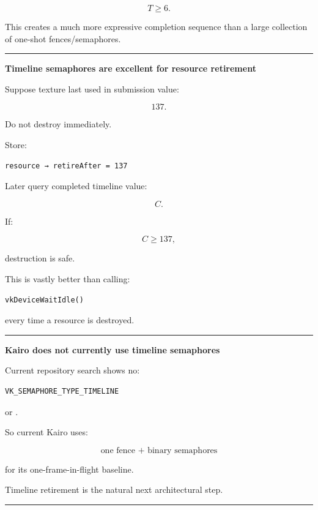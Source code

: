 \[
T\ge6.
\]

This creates a much more expressive completion sequence than a large collection of one-shot fences/semaphores.

\begin{center}\rule{0.5\linewidth}{0.5pt}\end{center}

\textbf{Timeline semaphores are excellent for resource retirement}

Suppose texture last used in submission value:

\[
137.
\]

Do not destroy immediately.

Store:

\begin{verbatim}
resource → retireAfter = 137
\end{verbatim}

Later query completed timeline value:

\[
C.
\]

If:

\[
C\ge137,
\]

destruction is safe.

This is vastly better than calling:

\begin{verbatim}
vkDeviceWaitIdle()
\end{verbatim}

every time a resource is destroyed.

\begin{center}\rule{0.5\linewidth}{0.5pt}\end{center}

\textbf{Kairo does not currently use timeline semaphores}

Current repository search shows no:

\begin{verbatim}
VK_SEMAPHORE_TYPE_TIMELINE
\end{verbatim}

or .

So current Kairo uses:

\[
\boxed{
\text{one fence + binary semaphores}
}
\]

for its one-frame-in-flight baseline.

Timeline retirement is the natural next architectural step.

\begin{center}\rule{0.5\linewidth}{0.5pt}\end{center}

